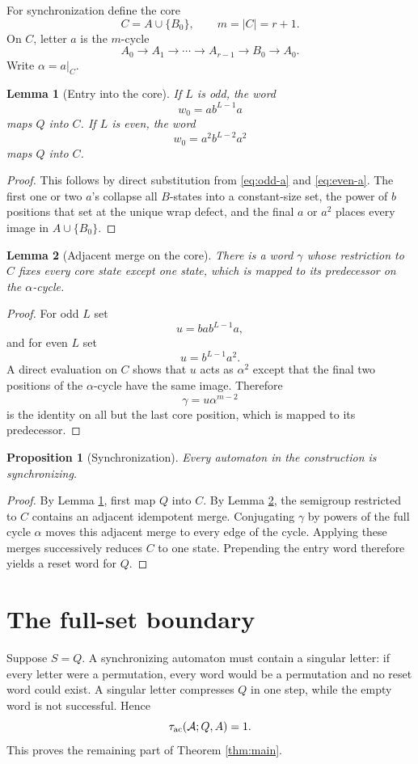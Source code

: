 \documentclass[11pt]{article}
\newtheorem{lemma}{Lemma}
\newtheorem{proposition}{Proposition}
\theoremstyle{definition}
\theoremstyle{remark}
\newcommand{\Acal}{\mathcal A}
\newcommand{\tauac}{\tau_{\rm ac}}
\begin{document}
For synchronization define the core
\[
C=A\cup\{B_0\},\qquad m=|C|=r+1.
\]
On $C$, letter $a$ is the $m$-cycle
\[
A_0\to A_1\to\cdots\to A_{r-1}\to B_0\to A_0.
\]
Write $\alpha=a|_C$.

\begin{lemma}[Entry into the core]\label{lem:entry}
If $L$ is odd, the word
\[
w_0=ab^{L-1}a
\]
maps $Q$ into $C$. If $L$ is even, the word
\[
w_0=a^2b^{L-2}a^2
\]
maps $Q$ into $C$.
\end{lemma}
\begin{proof}
This follows by direct substitution from \eqref{eq:odd-a} and \eqref{eq:even-a}. The first one or two $a$'s collapse all $B$-states into a constant-size set, the power of $b$ positions that set at the unique wrap defect, and the final $a$ or $a^2$ places every image in $A\cup\{B_0\}$.
\end{proof}

\begin{lemma}[Adjacent merge on the core]\label{lem:merge}
There is a word $\gamma$ whose restriction to $C$ fixes every core state except one state, which is mapped to its predecessor on the $\alpha$-cycle.
\end{lemma}
\begin{proof}
For odd $L$ set
\[
u=bab^{L-1}a,
\]
and for even $L$ set
\[
u=b^{L-1}a^2.
\]
A direct evaluation on $C$ shows that $u$ acts as $\alpha^2$ except that the final two positions of the $\alpha$-cycle have the same image. Therefore
\[
\gamma=u\alpha^{m-2}
\]
is the identity on all but the last core position, which is mapped to its predecessor.
\end{proof}

\begin{proposition}[Synchronization]\label{prop:sync}
Every automaton in the construction is synchronizing.
\end{proposition}
\begin{proof}
By Lemma \ref{lem:entry}, first map $Q$ into $C$. By Lemma \ref{lem:merge}, the semigroup restricted to $C$ contains an adjacent idempotent merge. Conjugating $\gamma$ by powers of the full cycle $\alpha$ moves this adjacent merge to every edge of the cycle. Applying these merges successively reduces $C$ to one state. Prepending the entry word therefore yields a reset word for $Q$.
\end{proof}

\section{The full-set boundary}
Suppose $S=Q$. A synchronizing automaton must contain a singular letter: if every letter were a permutation, every word would be a permutation and no reset word could exist. A singular letter compresses $Q$ in one step, while the empty word is not successful. Hence
\[
\tauac(\Acal;Q,A)=1.
\]
This proves the remaining part of Theorem \ref{thm:main}.
\end{document}
